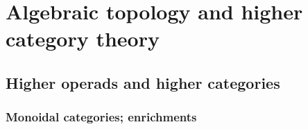 \chapter{Algebraic topology and higher category theory}
    \begin{abstract}
        
    \end{abstract}
    
    \minitoc
    
    \section{Higher operads and higher categories}
        \subsection{Monoidal categories; enrichments}
